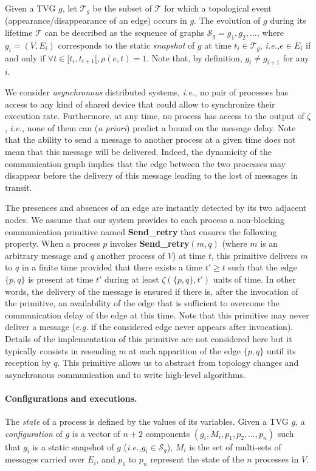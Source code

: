 \documentclass[11pt]{article}
\newcommand{\ie}{{\em i.e.,}\xspace}
\begin{document}
Given a TVG $g$, let $\mathcal{T}_g$ be the subset of $\mathcal{T}$ for which a topological event (appearance/disappearance of an edge) occurs in $g$. The evolution of $g$ during its lifetime $\mathcal{T}$ can be described as the sequence of graphs $\mathcal{S}_{g} = g_1, g_2,\ldots$, where $g_i=(V,E_i)$ corresponds to the static {\em snapshot} of $g$ at time $t_i \in \mathcal{T}_g$, \ie $e\in E_i$ if and only if $\forall t\in[t_i,t_{i+1}[,\rho(e,t) = 1$. Note that, by definition, $g_i \neq g_{i+1}$ for any $i$. 

We consider {\em asynchronous} distributed systems, \ie no pair of processes has access to any kind of shared device that could allow to synchronize their execution rate.  Furthermore, at any time, no process has access to the output of $\zeta$, \ie none of them can ({\em a priori}) predict a bound on the message delay. Note that the ability to send a message to another process at a given time does not mean that this message will be delivered. Indeed, the dynamicity of the communication graph implies that the edge between the two processes may disappear before the delivery of this message leading to the lost of messages in transit. 

The presences and absences of an edge are instantly detected by its two adjacent nodes. We assume that our system provides to each process a non-blocking communication primitive named \textbf{Send\_retry} that ensures the following property. When a process $p$ invokes \textbf{Send\_retry}$(m,q)$ (where $m$ is an arbitrary message and $q$ another process of $V$) at time $t$, this primitive delivers $m$ to $q$ in a finite time provided that there exists a time $t'\geq t$ such that the edge $\{p,q\}$ is present at time $t'$ during at least $\zeta(\{p,q\},t')$ units of time. In other words, the delivery of the message is ensured if there is, after the invocation of the primitive, an availability of the edge that is sufficient to overcome the communication delay of the edge at this time. Note that this primitive may never deliver a message (\emph{e.g.} if the considered edge never appears after invocation). Details of the implementation of this primitive are not considered here but it typically consists in resending $m$ at each apparition of the edge $\{p,q\}$ until its reception by $q$. This primitive allows us to abstract from topology changes and asynchronous communication and to write high-level algorithms.

\paragraph{Configurations and executions.} The \emph{state} of a process is defined by the values of its variables. Given a TVG $g$, a \emph{configuration} of $g$ is a vector of $n+2$ components $(g_i, M_i, p_1, p_2, \ldots, p_n)$ such that $g_i$ is a static snapshot of $g$ (\ie $g_i \in \mathcal{S}_{g}$), $M_i$ is the set of multi-sets of messages carried over $E_i$, and $p_1$ to $p_n$ represent the state of the $n$ processes in $V$. 
\end{document}
